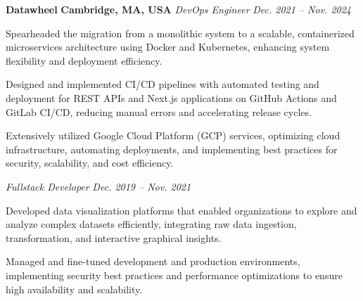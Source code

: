 \item
\headerrow
{\textbf{Datawheel}}
{\textbf{Cambridge, MA, USA}}
\headerrow
{\emph{DevOps Engineer}}
{\emph{Dec. 2021 -- Nov. 2024}}
\begin{itemize*}
    \item Spearheaded the migration from a monolithic system to a scalable, containerized microservices architecture using Docker and Kubernetes, enhancing system flexibility and deployment efficiency.
    \item Designed and implemented CI/CD pipelines with automated testing and deployment for REST APIs and Next.js applications on GitHub Actions and GitLab CI/CD, reducing manual errors and accelerating release cycles.
    \item Extensively utilized Google Cloud Platform (GCP) services, optimizing cloud infrastructure, automating deployments, and implementing best practices for security, scalability, and cost efficiency.
\end{itemize*}
\headerrow
{\emph{Fullstack Developer}}
{\emph{Dec. 2019 -- Nov. 2021}}
\begin{itemize*}
    \item Developed data visualization platforms that enabled organizations to explore and analyze complex datasets efficiently, integrating raw data ingestion, transformation, and interactive graphical insights.
    \item Managed and fine-tuned development and production environments, implementing security best practices and performance optimizations to ensure high availability and scalability.
\end{itemize*}